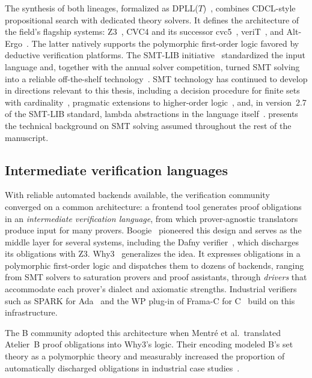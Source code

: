 The synthesis of both lineages, formalized as
DPLL(\(T\))~\cite{nieuwenhuis2006dpllt}, combines CDCL-style propositional
search with dedicated theory solvers. It defines the architecture of the
field's flagship systems: Z3~\cite{demoura2008z3}, CVC4 and its successor
cvc5~\cite{barrett2011cvc4,barbosa2022cvc5},
veriT~\cite{bouton2009verit}, and Alt-Ergo~\cite{conchon2018altergo}. The latter
natively supports the polymorphic first-order logic favored by deductive
verification platforms. The SMT-LIB initiative~\cite{barrett2010smtlib}
standardized the input language and, together with the annual solver
competition, turned SMT solving into a reliable off-the-shelf
technology~\cite{demoura2011smt}. SMT technology has continued to develop in
directions relevant to this thesis, including a decision procedure for finite
sets with cardinality~\cite{bansal2016sets}, pragmatic extensions to
higher-order logic~\cite{barbosa2019hosmt}, and, in version~2.7 of the SMT-LIB
standard, lambda abstractions in the language itself~\cite{smtlib2.7}.
 presents the technical background on SMT solving assumed
throughout the rest of the manuscript.

\subsection{Intermediate verification languages}
\label{subsec:rw-ivl}

With reliable automated backends available, the verification community
converged on a common architecture: a frontend tool generates proof obligations
in an \emph{intermediate verification language}, from which prover-agnostic
translators produce input for many provers. Boogie~\cite{barnett2006boogie}
pioneered this design and serves as the middle layer for several systems,
including the Dafny verifier~\cite{leino2010dafny}, which discharges its
obligations with Z3. Why3~\cite{bobot2011why3,filliatre2013why3} generalizes the
idea. It expresses obligations in a polymorphic first-order logic and dispatches
them to dozens of backends, ranging from SMT solvers to saturation provers and
proof assistants, through \emph{drivers} that accommodate each prover's dialect
and axiomatic strengths. Industrial verifiers such as SPARK for
Ada~\cite{hoang2015spark} and the WP plug-in of Frama-C for
C~\cite{kirchner2015framac} build on this infrastructure.

The B community adopted this architecture when Mentr\'e et al.\ translated
Atelier~B proof obligations into Why3's logic. Their encoding modeled B's set
theory as a polymorphic theory and measurably increased the proportion of
automatically discharged obligations in industrial case
studies~\cite{mentre2012discharging}.

